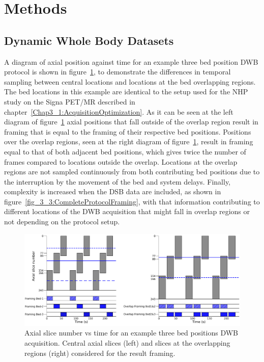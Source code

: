 \section{Methods}
\subsection{Dynamic Whole Body Datasets}
A diagram of axial position against time for an example three bed position DWB protocol is shown in figure~\ref{fig_3_3:OverlapFraming}, to demonstrate the differences in temporal sampling between central locations and locations at the bed overlapping regions. The bed locations in this example are identical to the setup used for the NHP study on the Signa PET/MR described in chapter~\ref{Chap3_1:AcquisitionOptimization}.
As it can be seen at the left diagram of figure~\ref{fig_3_3:OverlapFraming} axial positions that fall outside of the overlap region result in framing that is equal to the framing of their respective bed positions. Positions over the overlap regions, seen at the right diagram of figure~\ref{fig_3_3:OverlapFraming}, result in framing equal to that of both adjacent bed positions, which gives twice the number of frames compared to locations outside the overlap. Locations at the overlap regions are not sampled continuously from both contributing bed positions due to the interruption by the movement of the bed and system delays.  
Finally, complexity is increased when the DSB data are included, as shown in figure~\ref{fig_3_3:CompleteProtocolFraming}, with that information contributing to different locations of the DWB acquisition that might fall in overlap regions or not depending on the protocol setup. 

\begin{figure} [h!]
\centering
\includegraphics[scale=0.50,angle=0]{3_Results/3_3_DWB_Reconstruction/figures/OverlapTiming.pdf}
\caption{Axial slice number vs time for an example three bed positions DWB acquisition. Central axial slices (left) and slices at the overlapping regions (right) considered for the result framing.} 
\label{fig_3_3:OverlapFraming}
\end{figure} 

